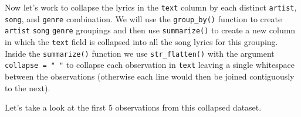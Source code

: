 \documentclass[
]{article}
\newenvironment{Shaded}{\begin{snugshade}}{\end{snugshade}}
\newcommand{\AttributeTok}[1]{\textcolor[rgb]{0.77,0.63,0.00}{#1}}
\newcommand{\CommentTok}[1]{\textcolor[rgb]{0.56,0.35,0.01}{\textit{#1}}}
\newcommand{\FunctionTok}[1]{\textcolor[rgb]{0.00,0.00,0.00}{#1}}
\newcommand{\NormalTok}[1]{#1}
\newcommand{\OtherTok}[1]{\textcolor[rgb]{0.56,0.35,0.01}{#1}}
\newcommand{\SpecialCharTok}[1]{\textcolor[rgb]{0.00,0.00,0.00}{#1}}
\newcommand{\StringTok}[1]{\textcolor[rgb]{0.31,0.60,0.02}{#1}}
\begin{document}
Now let's work to collapse the lyrics in the \texttt{text} column by each distinct \texttt{artist}, \texttt{song}, and \texttt{genre} combination. We will use the \texttt{group\_by()} function to create \texttt{artist} \texttt{song} \texttt{genre} groupings and then use \texttt{summarize()} to create a new column in which the \texttt{text} field is collapsed into all the song lyrics for this grouping. Inside the \texttt{summarize()} function we use \texttt{str\_flatten()} with the argument \texttt{collapse\ =\ "\ "} to collapse each observation in \texttt{text} leaving a single whitespace between the observations (otherwise each line would then be joined contiguously to the next).

\begin{Shaded}
\end{Shaded}

Let's take a look at the first 5 observations from this collapsed dataset.
\end{document}
